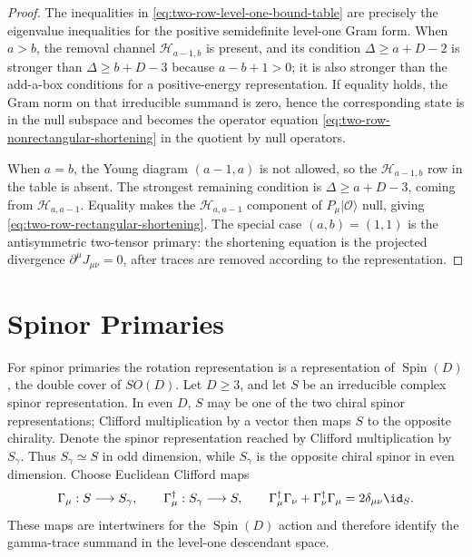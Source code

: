 \begin{proof}
The inequalities in \eqref{eq:two-row-level-one-bound-table} are precisely
the eigenvalue inequalities for the positive semidefinite level-one Gram form.
When \(a>b\), the removal channel \(\mathcal H_{a-1,b}\) is present, and its
condition \(\Delta\ge a+D-2\) is stronger than
\(\Delta\ge b+D-3\) because \(a-b+1>0\); it is also stronger than the
add-a-box conditions for a positive-energy representation.  If equality holds,
the Gram norm on that irreducible summand is zero, hence the corresponding
state is in the null subspace and becomes the operator equation
\eqref{eq:two-row-nonrectangular-shortening} in the quotient by null
operators.

When \(a=b\), the Young diagram \((a-1,a)\) is not allowed, so the
\(\mathcal H_{a-1,b}\) row in the table is absent.  The strongest remaining
condition is \(\Delta\ge a+D-3\), coming from
\(\mathcal H_{a,a-1}\).  Equality makes the
\(\mathcal H_{a,a-1}\) component of \(P_\mu|\mathcal O\rangle\) null, giving
\eqref{eq:two-row-rectangular-shortening}.  The special case
\((a,b)=(1,1)\) is the antisymmetric two-tensor primary: the shortening
equation is the projected divergence \(\partial^\mu J_{\mu\nu}=0\), after
traces are removed according to the representation.
\end{proof}

\section{Spinor Primaries}

For spinor primaries the rotation representation is a representation of
\(\operatorname{Spin}(D)\), the double cover of \(SO(D)\).  Let \(D\ge3\), and
let \(S\) be an irreducible complex spinor representation.  In even \(D\),
\(S\) may be one of the two chiral spinor representations; Clifford
multiplication by a vector then maps \(S\) to the opposite chirality.  Denote
the spinor representation reached by Clifford multiplication by \(S_\gamma\).
Thus \(S_\gamma\simeq S\) in odd dimension, while \(S_\gamma\) is the opposite
chiral spinor in even dimension.  Choose Euclidean Clifford maps
\[
  \Gamma_\mu:S\longrightarrow S_\gamma,
  \qquad
  \Gamma_\mu^\dagger:S_\gamma\longrightarrow S,
  \qquad
  \Gamma_\mu^\dagger\Gamma_\nu+\Gamma_\nu^\dagger\Gamma_\mu
  =
  2\delta_{\mu\nu}\id_S .
\]
These maps are intertwiners for the \(\operatorname{Spin}(D)\) action and
therefore identify the gamma-trace summand in the level-one descendant space.

